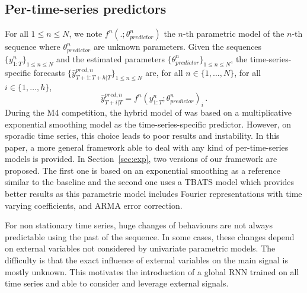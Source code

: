 \documentclass[10pt]{article} %
\newcommand{\ts}{y}
\newcommand{\tspred}{\widehat{\ts}}
\newcommand{\stat}{f}
\newcommand{\statparam}{\theta_{predictor}}
\newcommand{\lag}{h}
\begin{document}
\subsection{Per-time-series predictors}
For all $1\leqslant n \leqslant N$, we note $\stat^n(.;\statparam^n)$ the $n$-th parametric model of the $n$-th sequence where $\statparam^n$ are  unknown parameters. Given the sequences $\{\ts^n_{1:T}\}_{1\leqslant n \leqslant N}$ and the estimated  parameters $\{\statparam^n\}_{1\leqslant n \leqslant N}$, the time-series-specific forecasts $\{\tspred^{pred,n}_{T+1:T+\lag|T}\}_{1\leqslant n \leqslant N}$ are, for all $n \in \{1,\ldots,N\}$, for all $i \in \{1,\ldots,\lag\}$,
\begin{equation}
    \label{eq:predictors}
    \tspred^{pred,n}_{T+i|T} = \stat^n(\ts^n_{1:T};\statparam^n)_i\,.
\end{equation}
During the M4 competition, the hybrid model of \citet{smyl2020} was based on a multiplicative exponential smoothing model as the time-series-specific predictor. However, on sporadic time series, this choice leads to poor results and instability. In this paper, a more general framework able to deal with any kind of per-time-series models is provided. In Section~\ref{sec:exp}, two versions of our framework are proposed. The first one is based on an  exponential smoothing as a reference similar to the baseline \citet{smyl2020} and the second one uses a TBATS model \citep{alysha2011} which provides better results as this parametric model includes  Fourier representations with time varying coefficients, and ARMA error correction. 

For non stationary time series, huge changes of behaviours are not always predictable using the past of the sequence. In some cases, these changes depend on external variables not considered by univariate parametric models. The difficulty is that the exact influence of external variables on the main signal is mostly unknown. This motivates the introduction of a global RNN trained on all time series and able to consider and leverage external signals.
\end{document}
